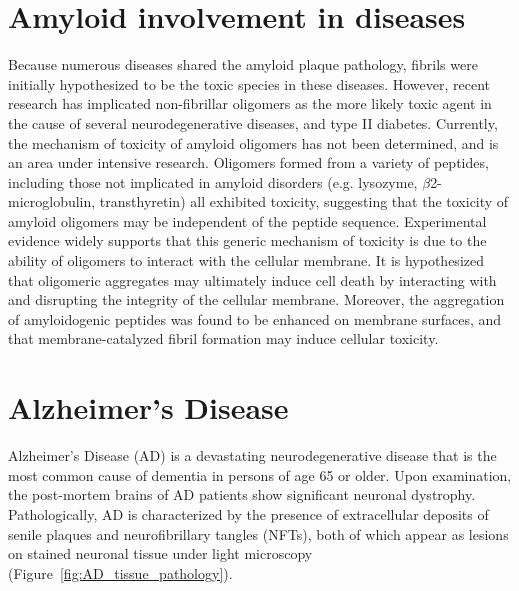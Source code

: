 \section{Amyloid involvement in diseases}

Because numerous diseases shared the amyloid plaque pathology, fibrils were initially hypothesized to be the toxic species in these diseases. However, recent research has implicated non-fibrillar oligomers as the more likely toxic agent in the cause of several neurodegenerative diseases, and type II diabetes.\cite{Haass:2007db,Xue:2009da,Berthelot:2013fs} %
Currently, the mechanism of toxicity of amyloid oligomers has not been determined, and is an area under intensive research.  Oligomers formed from a variety of peptides, including those not implicated in amyloid disorders (e.g. lysozyme, $\beta$2-microglobulin, transthyretin) all exhibited toxicity, suggesting that the toxicity of amyloid oligomers may be independent of the peptide sequence.\cite{Fandrich:2012kb,Kayed:2003en} Experimental evidence widely supports that this generic mechanism of toxicity is due to the ability of oligomers to interact with the cellular membrane.\cite{Martins:2008bz,Walsh:2007fu} It is hypothesized that oligomeric aggregates may ultimately induce cell death by interacting with and disrupting the integrity of the cellular membrane.\cite{Fandrich:2012kb} Moreover, the aggregation of amyloidogenic peptides was found to be enhanced on membrane surfaces,\cite{McLaurin:1997wm,Kayed:2004ul,Yip:2002vx} and that membrane-catalyzed fibril formation may induce cellular toxicity.\cite{Yip:2001tl}


\section{Alzheimer's Disease}
Alzheimer's Disease (AD) is a devastating neurodegenerative disease that is the most common cause of dementia in persons of age 65 or older. Upon examination, the post-mortem brains of AD patients show significant neuronal dystrophy. Pathologically, AD is characterized by the presence of extracellular deposits of senile plaques and neurofibrillary tangles (NFTs), both of which appear as lesions on stained neuronal tissue under light microscopy (Figure~\ref{fig:AD_tissue_pathology}).

